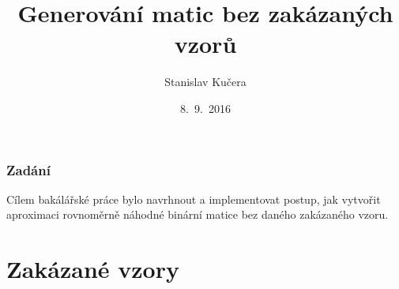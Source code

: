 \documentclass{beamer}
\title{Generování matic bez zakázaných vzorů}
\author{Stanislav Kučera}
\institute[IÚUK]{Informatický ústav Univerzity Karlovy}
\date{8.~9.~2016}
\begin{document}
\begin{frame}
\titlepage
\end{frame}

\begin{frame}
\frametitle{Zadání}
Cílem bakálářské práce bylo navrhnout a implementovat postup, jak vytvořit aproximaci rovnoměrně náhodné binární matice bez daného zakázaného vzoru.
\end{frame}

\section{Zakázané vzory}
\end{document}
